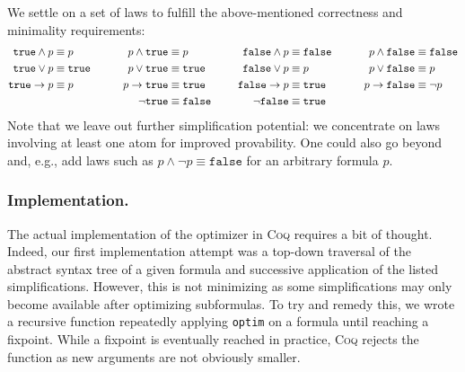 We settle on a set of laws to fulfill the above-mentioned correctness and minimality requirements:
\begin{alignat*}{4}
    \texttt{true} \land p &\equiv p &p \land \texttt{true} &\equiv p &\texttt{false} \land p &\equiv \texttt{false}\hspace*{20pt}&p \land \texttt{false} &\equiv \texttt{false} \\
    \texttt{true} \lor p &\equiv \texttt{true}\hspace*{20pt}&p \lor \texttt{true} &\equiv \texttt{true}\hspace*{20pt}&\texttt{false} \lor p &\equiv p &p \lor \texttt{false} &\equiv p \\
    \texttt{true} \rightarrow p &\equiv p &p \rightarrow \texttt{true} &\equiv \texttt{true} &\texttt{false} \rightarrow p &\equiv \texttt{true} &p \rightarrow \texttt{false} &\equiv \neg p \\
    &&\neg \texttt{true} &\equiv \texttt{false} &\neg \texttt{false} &\equiv \texttt{true}
\end{alignat*}
Note that we leave out further simplification potential: we concentrate on laws involving at least one atom for improved provability.
One could also go beyond and, e.g., add laws such as $p \land \neg p \equiv \texttt{false}$ for an arbitrary formula $p$.

\subsubsection{Implementation.}

The actual implementation of the optimizer in \textsc{Coq} requires a bit of thought.
Indeed, our first implementation attempt was a top-down traversal of the abstract syntax tree of a given formula and successive application of the listed simplifications.
However, this is not minimizing as some simplifications may only become available after optimizing subformulas.
To try and remedy this, we wrote a recursive function repeatedly applying \texttt{optim} on a formula until reaching a fixpoint.
While a fixpoint is eventually reached in practice, \textsc{Coq} rejects the function as new arguments are not obviously smaller.

